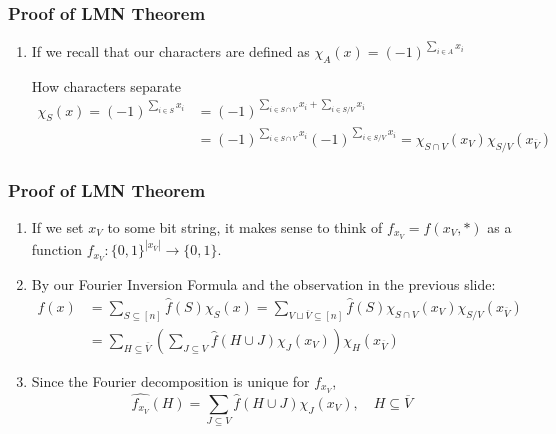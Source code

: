\documentclass{beamer}
\begin{document}
\begin{frame}
  \frametitle{Proof of LMN Theorem}
  \begin{enumerate}
    \item If we recall that our characters are defined as $\chi_A(x) = (-1)^{\sum_{i \in A} x_i}$
    \pause
    \begin{block}{How characters separate}
      \begin{align*}
        \chi_S(x) = (-1)^{\sum_{i \in S} x_i}
        & = (-1)^{\sum_{i \in S \cap V} x_i + \sum_{i \in S / V} x_i}   \\
        & = (-1)^{\sum_{i \in S \cap V} x_i}(-1)^{\sum_{i \in S / V} x_i} = \chi_{S \cap V}(x_V) \chi_{S / V}(x_{\overline{V}})
      \end{align*}
    \end{block}
  \end{enumerate}
\end{frame}


\begin{frame}
  \frametitle{Proof of LMN Theorem}
  \begin{enumerate}
    \item If we set $x_V$ to some bit string, it makes sense to think of $f_{x_V} = f(x_V,*)$ as a function $f_{x_V}: \{0,1\}^{|x_{\overline{V}}|} \rightarrow \{0,1\}$.
    \pause
    \item By our Fourier Inversion Formula and the observation in the previous slide:
    \begin{align*}
    f(x)
    & = \sum_{S \subseteq [n]} \hat{f}(S)\chi_{S}(x) =  \sum_{V \sqcup \overline{V} \subseteq [n]} \hat{f}(S)\chi_{S \cap V}(x_V)\chi_{S / V}({x_{\overline{V}}}) \\
    & = \sum_{H \subseteq \overline{V}} \left( \sum_{J \subseteq V} \hat{f}(H \cup J) \chi_{J}(x_V) \right) \chi_H(x_{\overline{V}})
  \end{align*}
    \item
    Since the Fourier decomposition is unique for $f_{x_V}$,
    \begin{equation*}
      \widehat{f_{x_V}}(H) = \sum_{J \subseteq V} \hat{f}(H \cup J)\chi_{J}(x_V), \quad H \subseteq \overline{V}
    \end{equation*}
  \end{enumerate}
\end{frame}
\end{document}
